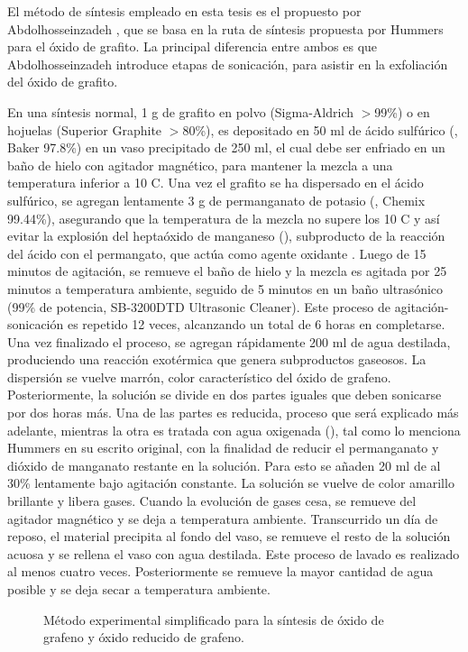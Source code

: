 El método de síntesis empleado en esta tesis es el propuesto por Abdolhosseinzadeh \citep{Abdolhosseinzadeh2015}, que se basa en la ruta de síntesis propuesta por Hummers para el óxido de grafito. La principal diferencia entre ambos es que Abdolhosseinzadeh introduce etapas de sonicación, para asistir en la exfoliación del óxido de grafito.

En una síntesis normal, 1 g de grafito en polvo (Sigma-Aldrich $>$99\%) o en hojuelas (Superior Graphite $>$80\%), es depositado en 50 ml de ácido sulfúrico (, Baker 97.8\%) en un vaso precipitado de 250 ml, el cual debe ser enfriado en un baño de hielo con agitador magnético, para mantener la mezcla a una temperatura inferior a 10 \degree C. Una vez el grafito se ha dispersado en el ácido sulfúrico, se agregan lentamente 3 g de permanganato de potasio (, Chemix 99.44\%), asegurando que la temperatura de la mezcla no supere los 10 \degree C y así evitar la explosión del heptaóxido de manganeso (), subproducto de la reacción del ácido con el permangato, que actúa como agente oxidante \citep{Dreyer2010}. Luego de 15 minutos de agitación, se remueve el baño de hielo y la mezcla es agitada por 25 minutos a temperatura ambiente, seguido de 5 minutos en un baño ultrasónico (99\% de potencia, SB-3200DTD Ultrasonic Cleaner). Este proceso de agitación-sonicación es repetido 12 veces, alcanzando un total de 6 horas en completarse. Una vez finalizado el proceso, se agregan rápidamente 200 ml de agua destilada, produciendo una reacción exotérmica que genera subproductos gaseosos. La dispersión se vuelve marrón, color característico del óxido de grafeno. Posteriormente, la solución se divide en dos partes iguales que deben sonicarse por dos horas más. Una de las partes es reducida, proceso que será explicado más adelante, mientras la otra es tratada con agua oxigenada (), tal como lo menciona Hummers en su escrito original, con la finalidad de reducir el permanganato y dióxido de manganato restante en la solución. Para esto se añaden 20 ml de  al 30\% lentamente bajo agitación constante. La solución se vuelve de color amarillo brillante y libera gases. Cuando la evolución de gases cesa, se remueve del agitador magnético y se deja a temperatura ambiente. Transcurrido un día de reposo, el material precipita al fondo del vaso, se remueve el resto de la solución acuosa y se rellena el vaso con agua destilada. Este proceso de lavado es realizado al menos cuatro veces. Posteriormente se remueve la mayor cantidad de agua posible y se deja secar a temperatura ambiente.

\begin{figure}
	\centering
	\caption[Método experimental simplicado para la síntesis de óxido de grafeno y óxido reducido de grafeno]{Método experimental simplificado para la síntesis de óxido de grafeno y óxido reducido de grafeno.}
\end{figure}



